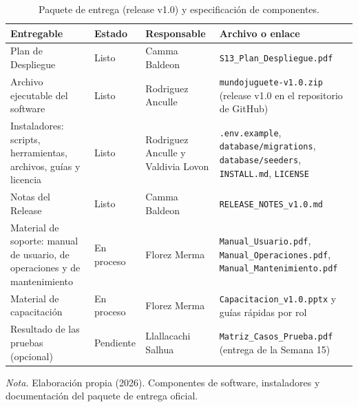 \begin{table}[H]
  \centering
  \small
  \caption{Paquete de entrega (release v1.0) y especificación de componentes.}
  \label{tab:despliegue_release}
  \begin{tabularx}{\linewidth}{|>{\raggedright\arraybackslash}p{3.8cm}|>{\centering\arraybackslash}p{2.0cm}|>{\raggedright\arraybackslash}p{2.8cm}|>{\raggedright\arraybackslash}X|}
    \hline
    \textbf{Entregable} & \textbf{Estado} & \textbf{Responsable} & \textbf{Archivo o enlace} \\ \hline
    Plan de Despliegue & Listo & Camma Baldeon & \texttt{S13\_Plan\_Despliegue.pdf} \\ \hline
    Archivo ejecutable del software & Listo & Rodriguez Anculle & \texttt{mundojuguete-v1.0.zip} (release v1.0 en el repositorio de GitHub) \\ \hline
    Instaladores: scripts, herramientas, archivos, guías y licencia & Listo & Rodriguez Anculle y Valdivia Lovon & \texttt{.env.example}, \texttt{database/migrations}, \texttt{database/seeders}, \texttt{INSTALL.md}, \texttt{LICENSE} \\ \hline
    Notas del Release & Listo & Camma Baldeon & \texttt{RELEASE\_NOTES\_v1.0.md} \\ \hline
    Material de soporte: manual de usuario, de operaciones y de mantenimiento & En proceso & Florez Merma & \texttt{Manual\_Usuario.pdf}, \texttt{Manual\_Operaciones.pdf}, \texttt{Manual\_Mantenimiento.pdf} \\ \hline
    Material de capacitación & En proceso & Florez Merma & \texttt{Capacitacion\_v1.0.pptx} y guías rápidas por rol \\ \hline
    Resultado de las pruebas (opcional) & Pendiente & Llallacachi Salhua & \texttt{Matriz\_Casos\_Prueba.pdf} (entrega de la Semana 15) \\ \hline
  \end{tabularx}
  \par\vspace{0.2cm}
  {\raggedright \small \emph{Nota.} Elaboración propia (2026). Componentes de software, instaladores y documentación del paquete de entrega oficial.\par}
\end{table}
